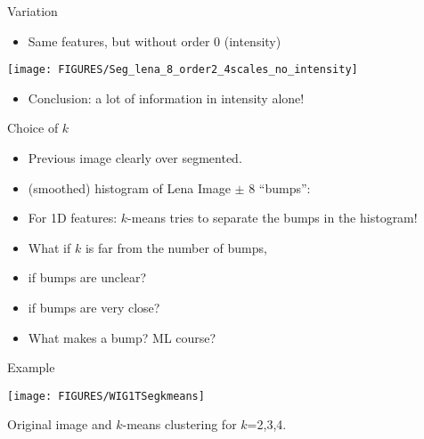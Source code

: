\documentclass[9pt]{beamer}
\begin{document}
\begin{frame}[t]{Variation}
  \begin{itemize}
  \item Same features, but without order 0 (intensity)
  \end{itemize}
  \begin{center}
    \texttt{[image: FIGURES/Seg\_lena\_8\_order2\_4scales\_no\_intensity]}
  \end{center}
  \begin{itemize}
  \item Conclusion: a lot of information in intensity alone!
  \end{itemize}
  \pause
  \begin{center}
  \end{center}

\end{frame}


\begin{frame}[t]{Choice of $k$}
  \begin{itemize}
    \item Previous image clearly over segmented.
  \item (smoothed) histogram of Lena Image $\pm$ 8 ``bumps'':
    \begin{center}
    \end{center}
  \item For 1D features: $k$-means tries to separate the bumps in the histogram!
  \item What if $k$ is far from the number of bumps,
  \item if bumps are unclear?
  \item if bumps are very close?
  \item What makes a bump? ML course?
    \pause
\end{itemize}
\end{frame}


\begin{frame}{Example}
  \begin{center}
    \texttt{[image: FIGURES/WIG1TSegkmeans]}
  \end{center}
  Original image and $k$-means clustering for $k$=2,3,4. 
\end{frame}
\end{document}
